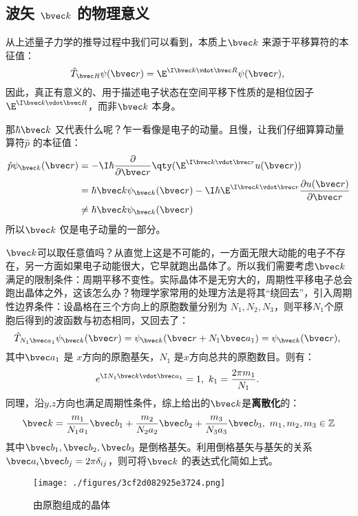 \subsection{波矢 $\bvec k$ 的物理意义}
从上述量子力学的推导过程中我们可以看到，本质上$\bvec k$ 来源于平移算符的本征值：
\begin{equation}
\hat{T}_{\bvec R} \psi (\bvec r) = \E^{\I \bvec k \vdot  \bvec R}\psi (\bvec r),~
\end{equation}
因此，真正有意义的、用于描述电子状态在空间平移下性质的是相位因子$\E^{\I \bvec k \vdot  \bvec R}$，而非$\bvec k$ 本身。

那$\hbar \bvec k$ 又代表什么呢？乍一看像是电子的动量。且慢，让我们仔细算算动量算符$\hat{p}$ 的本征值：
\begin{equation}
\begin{aligned}
\hat{p} \psi_{\bvec k} (\bvec r) &= -\I \hbar \dfrac{\partial}{\partial \bvec r} \qty(\E^{\I \bvec k \vdot \bvec r} u(\bvec r))\\
& = \hbar \bvec k \psi_{\bvec k} (\bvec r) -\I \hbar \E^{\I \bvec k \vdot \bvec r} \dfrac{\partial  u(\bvec r)}{\partial \bvec r}\\
 &\neq \hbar \bvec k \psi_{\bvec k} (\bvec r)\\
\end{aligned}
\end{equation}
所以$\bvec k$ 仅是电子动量的一部分。

$\bvec k$可以取任意值吗？从直觉上这是不可能的，一方面无限大动能的电子不存在，另一方面如果电子动能很大，它早就跑出晶体了。所以我们需要考虑$\bvec k$ 满足的限制条件：周期平移不变性。实际晶体不是无穷大的，周期性平移电子总会跑出晶体之外，这该怎么办？物理学家常用的处理方法是将其“绕回去”，引入周期性边界条件：设晶格在三个方向上的原胞数量分别为 $N_1,N_2,N_3$，则平移$N_1$个原胞后得到的波函数与初态相同，又回去了：
\begin{equation}
\hat T _{N_1 \bvec a_1}\psi_{\bvec k}(\bvec r)=\psi_{\bvec k}(\bvec r+N_1 \bvec a_1) = \psi_{\bvec k}(\bvec r),~
\end{equation}
其中$\bvec a_1$ 是 $x$方向的原胞基矢，$N_1$ 是$x$方向总共的原胞数目。则有：
\begin{equation}
e^{\I N_1 \bvec k \vdot  \bvec a_1} = 1,~ k_1 =\frac{2\pi m_1}{N_1}.~
\end{equation}
同理，沿$y$,$z$方向也满足周期性条件，综上给出的$\bvec k$是\textbf{离散化}的：
\begin{equation}
\bvec k = \dfrac{m_1}{N_1 a_1} \bvec b_1 + \dfrac{m_2}{N_2 a_2} \bvec b_2 + \dfrac{m_3}{N_3 a_3} \bvec b_3,~ m_1,m_2,m_3 \in \mathbb{Z}
\end{equation}
其中$\bvec b_1, \bvec b_2,\bvec b_3$ 是倒格基矢。利用倒格基矢与基矢的关系$\bvec a_i \bvec b_j = 2\pi \delta_{ij}$，则可将$\bvec k$ 的表达式化简如上式。
\begin{figure}[ht]
\centering
\texttt{[image: ./figures/3cf2d082925e3724.png]}
\caption{由原胞组成的晶体} \label{fig_Bloch_6}
\end{figure}

